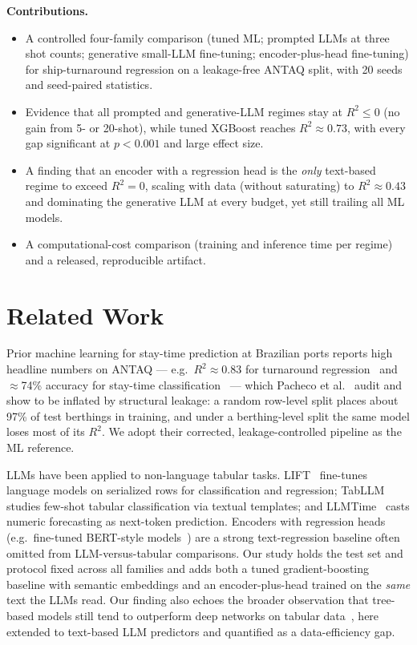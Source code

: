 \documentclass[kdmile,a4paper]{kdmile}
\begin{document}
\noindent\textbf{Contributions.}
\begin{itemize}
\item A controlled four-family comparison (tuned ML; prompted LLMs at three shot counts; generative small-LLM fine-tuning; encoder-plus-head fine-tuning) for ship-turnaround regression on a leakage-free ANTAQ split, with 20 seeds and seed-paired statistics.
\item Evidence that all prompted and generative-LLM regimes stay at $R^2\le0$ (no gain from 5- or 20-shot), while tuned XGBoost reaches $R^2\approx0.73$, with every gap significant at $p<0.001$ and large effect size.
\item A finding that an encoder with a regression head is the \emph{only} text-based regime to exceed $R^2=0$, scaling with data (without saturating) to $R^2\approx0.43$ and dominating the generative LLM at every budget, yet still trailing all ML models.
\item A computational-cost comparison (training and inference time per regime) and a released, reproducible artifact.
\end{itemize}

\section{Related Work}
Prior machine learning for stay-time prediction at Brazilian ports reports high headline numbers on ANTAQ --- e.g.\ $R^2\approx0.83$ for turnaround regression~\cite{rao2025} and $\approx$74\% accuracy for stay-time classification~\cite{abreu2023} --- which Pacheco et al.~\cite{pacheco2026pitfalls} audit and show to be inflated by structural leakage: a random row-level split places about 97\% of test berthings in training, and under a berthing-level split the same model loses most of its $R^2$. We adopt their corrected, leakage-controlled pipeline as the ML reference.

LLMs have been applied to non-language tabular tasks. LIFT~\cite{dinh2022lift} fine-tunes language models on serialized rows for classification and regression; TabLLM~\cite{hegselmann2023tabllm} studies few-shot tabular classification via textual templates; and LLMTime~\cite{gruver2023llmtime} casts numeric forecasting as next-token prediction. Encoders with regression heads (e.g.\ fine-tuned BERT-style models~\cite{reimers2019sbert}) are a strong text-regression baseline often omitted from LLM-versus-tabular comparisons. Our study holds the test set and protocol fixed across all families and adds both a tuned gradient-boosting baseline with semantic embeddings and an encoder-plus-head trained on the \emph{same} text the LLMs read. Our finding also echoes the broader observation that tree-based models still tend to outperform deep networks on tabular data~\cite{grinsztajn2022}, here extended to text-based LLM predictors and quantified as a data-efficiency gap.
\end{document}

